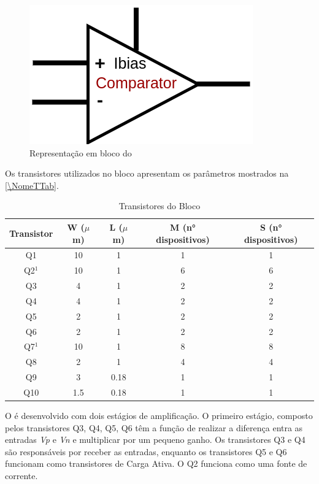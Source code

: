 \begin{figure}[!h]
 \centering
    \centering
    \caption{\label{\NomeSFig}Representação em bloco do \NomeBloco}
    \includegraphics[scale=0.3]{Circuitos/Comparator_block.png}
\end{figure}

Os transistores utilizados no bloco \NomeBloco{} apresentam os par\^ametros mostrados na \autoref{\NomeTTab}.

\begin{table}[!h]
\caption{Transistores do Bloco \NomeBloco}
\label{\NomeTTab}
\centering
\begin{tabular}{ccccc}
\toprule
Transistor & W ($\mu$m)  & L ($\mu$m)           & M (n° dispositivos) & S (n° dispositivos)\\
\midrule \midrule
Q1 & 10 & 1 & 1 & 1\\
\midrule
Q2$^1$ & 10 & 1 & 6 & 6\\
\midrule
Q3 & 4 & 1 & 2 & 2\\
\midrule
Q4 & 4 & 1 & 2 & 2\\
\midrule
Q5 & 2 & 1 & 2 & 2\\
\midrule
Q6 & 2 & 1 & 2 & 2\\
\midrule
Q7$^1$ & 10 & 1 & 8 & 8\\
\midrule
Q8 & 2 & 1 & 4 & 4\\
\midrule
Q9 & 3 & 0.18 & 1 & 1\\
\midrule
Q10 & 1.5 & 0.18 & 1 & 1\\

\bottomrule
\end{tabular}
\end{table}
 
O \NomeBloco{} \'e desenvolvido com dois est\'agios de amplificação. O primeiro est\'agio, composto pelos transistores Q3, Q4, Q5, Q6 t\^em a função de realizar a diferença entra as entradas \textit{Vp} e \textit{Vn} e multiplicar por um pequeno ganho. Os transistores Q3 e Q4 são respons\'aveis por receber as entradas, enquanto os transistores Q5 e Q6 funcionam como transistores de Carga Ativa. O Q2 funciona como uma fonte de corrente.

